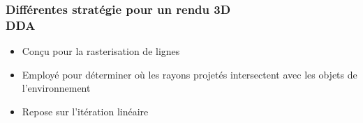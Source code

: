 \documentclass{beamer}
\begin{document}
\begin{frame}
    \frametitle{Différentes stratégie pour un rendu 3D \\
                \small DDA}           
    \begin{block}{}
        \begin{itemize}
            \item Conçu pour la rasterisation de lignes
            \item Employé pour déterminer où les rayons projetés intersectent avec les objets de l'environnement
            \item Repose sur l'itération linéaire
        \end{itemize}
    \end{block}    
\end{frame}
\end{document}

